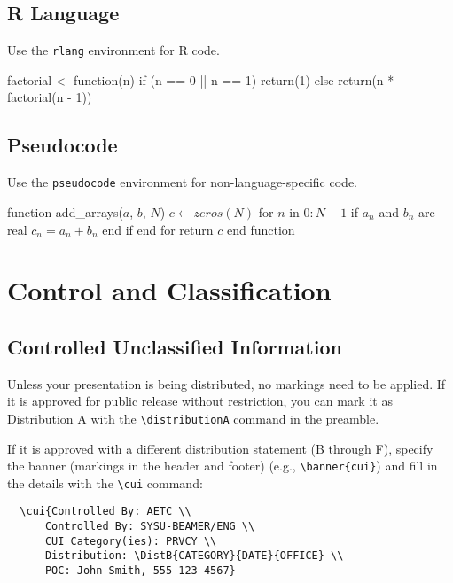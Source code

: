 \documentclass{sysubeamer}
\begin{document}
\section{R Language}

Use the \verb|rlang| environment for R code.
\begin{rlang}
factorial <- function(n) {
    if (n == 0 || n == 1) {
        return(1)
    } else {
        return(n * factorial(n - 1))
    }
}
\end{rlang}

\section{Pseudocode}

Use the \verb|pseudocode| environment for non-language-specific code.
\begin{pseudocode}
function add_arrays($a$, $b$, $N$)
    $c \gets zeros(N)$
    for $n$ in $0:N-1$
        if $a_n$ and $b_n$ are real
            $c_n = a_n + b_n$
        end if
    end for
    return $c$
end function
\end{pseudocode}

\chapter{Control and Classification}

\section{Controlled Unclassified Information}

Unless your presentation is being distributed, no markings need to be applied.
If it is approved for public release without restriction, you can mark it as
Distribution A with the \verb|\distributionA| command in the preamble.

If it is approved with a different distribution statement (B through F), specify
the banner (markings in the header and footer) (e.g., \verb|\banner{cui}|) and
fill in the details with the \verb|\cui| command:
\begin{verbatim}
  \cui{Controlled By: AETC \\
      Controlled By: SYSU-BEAMER/ENG \\
      CUI Category(ies): PRVCY \\
      Distribution: \DistB{CATEGORY}{DATE}{OFFICE} \\
      POC: John Smith, 555-123-4567}
\end{verbatim}
\end{document}
